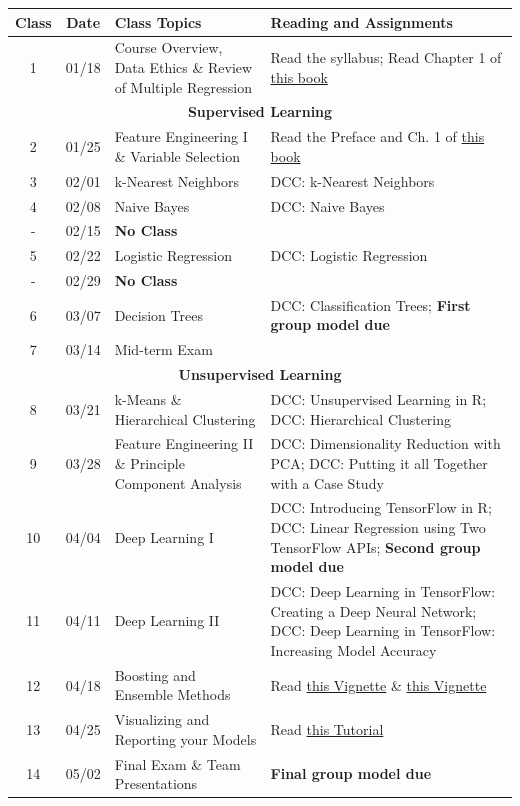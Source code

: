 \documentclass[11pt]{article}
\begin{document}
\def\arraystretch{1.5}%
{\footnotesize
\begin{longtable}{ | c | c | p{5.5cm} | p{7.5cm} |}
\hline
\hline
\textbf{Class} & \textbf{Date} & \textbf{Class Topics} & \textbf{Reading and Assignments} \\
\hline
\hline
1 & 01/18 & Course Overview, Data Ethics \& Review of Multiple Regression & Read the syllabus; Read Chapter 1 of \href{https://srdas.github.io/MLBook/DataScience.html}{this book} \\
\hline
\hline
\multicolumn{4}{c}{\cellcolor{gray!25}\textbf{Supervised Learning}} \\
\hline
\hline
2 &01/25 & Feature Engineering I \& Variable Selection & Read the Preface and Ch. 1 of \href{http://www.feat.engineering/}{this book}  \\
\hline
3 &02/01 & k-Nearest Neighbors &  DCC: k-Nearest Neighbors\\
\hline
4 & 02/08 & Naive Bayes &  DCC: Naive Bayes \\
\hline
- & 02/15 & \textbf{No Class} & \\
\hline
5 & 02/22 & Logistic Regression & DCC: Logistic Regression  \\
\hline
- & 02/29 & \textbf{No Class} &  \\
\hline
6 & 03/07 & Decision Trees & DCC: Classification Trees; \textbf{First group model due}  \\
\hline
7 & 03/14 & Mid-term Exam & \\
\hline
\hline
\multicolumn{4}{c}{\cellcolor{gray!25}\textbf{Unsupervised Learning}} \\
\hline
\hline
8 & 03/21 & k-Means \& Hierarchical Clustering &  DCC: Unsupervised Learning in R; DCC: Hierarchical Clustering \\
\hline
9 & 03/28 & Feature Engineering II \& Principle Component Analysis & DCC: Dimensionality Reduction with PCA; DCC: Putting it all Together with a Case Study  \\
\hline
10 & 04/04 & Deep Learning I & DCC: Introducing TensorFlow in R; DCC: Linear Regression using Two TensorFlow APIs;  \textbf{Second group model due}\\
\hline
11 & 04/11 & Deep Learning II  &  DCC: Deep Learning in TensorFlow: Creating a Deep Neural Network; DCC: Deep Learning in TensorFlow: Increasing Model Accuracy \\
\hline
12 & 04/18 & Boosting and Ensemble Methods  & Read \href{https://xgboost.readthedocs.io/en/latest/R-package/xgboostPresentation.html}{this Vignette} \& \href{https://cran.r-project.org/web/packages/caretEnsemble/vignettes/caretEnsemble-intro.html}{this Vignette}  \\
\hline
13 & 04/25 & Visualizing and Reporting your Models & Read \href{https://www.jwilber.me/nest/}{this Tutorial} \\
\hline
14 & 05/02 & Final Exam \& Team Presentations & \textbf{Final group model due} \\
\hline
\end{longtable}}
\end{document}
